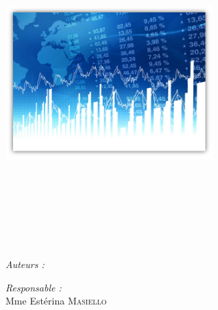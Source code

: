 \begin{titlepage}

\begin{center}



~\vspace*{5mm}

\begin{minipage}[t]{0.48\textwidth}
  \begin{flushleft}
    \centering \includegraphics [width=8cm]{images/presentation3.png} \\[0.5cm]
    \begin{spacing}{1.5}
    \end{spacing}
  \end{flushleft}
\end{minipage}

~\vspace*{12mm}

\textsc{\Large \reportsubject}\\[0.5cm]
\HRule \\[0.4cm]
{\huge \bfseries \reporttitle}\\[0.4cm]
\HRule \\[1.5cm]

\begin{minipage}[t]{0.3\textwidth}
  \begin{flushleft} \large
    \emph{Auteurs :}\\
    \reportauthor
  \end{flushleft}
\end{minipage}
\begin{minipage}[t]{0.6\textwidth}
  \begin{flushright} \large
    \emph{Responsable :}\\Mme Estérina \textsc{Masiello} \\
  \end{flushright}
\end{minipage}


\end{center}
\end{titlepage}
